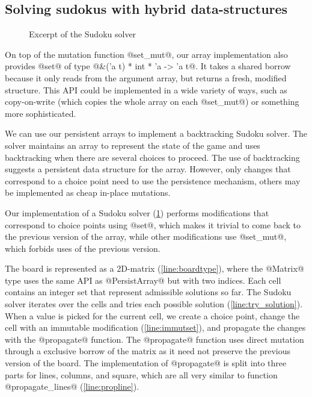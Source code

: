 \subsection{Solving sudokus with hybrid data-structures}

\begin{figure}[tp]
  
  \vspace{-15pt}
  \caption{Excerpt of the Sudoku solver}
  \label{ex:sudoku}
\end{figure}

On top of the mutation function @set_mut@, our array implementation
also provides @set@ of type @&('a t) * int * 'a -> 'a t@. It
takes a shared borrow because it only reads from the
argument array, but returns a fresh, modified structure.
%
This API could be implemented in a wide variety of ways, such as
copy-on-write (which copies the whole array on each @set_mut@)
or something more sophisticated\cite{DBLP:conf/ml/ConchonF07}.

We can use our persistent arrays
to implement a backtracking Sudoku solver.
The solver maintains an array to represent the state of
the game and uses backtracking when there are several choices to proceed.
The use of backtracking suggests a persistent data structure for the array.
However, only changes that correspond to a choice point need to use
the persistence mechanism, others may be implemented as
cheap in-place mutations.

Our implementation of a Sudoku solver (\cref{ex:sudoku}) performs
modifications that correspond to choice points using @set@,
which makes it trivial to come back to the previous version
of the array, while other modifications use @set_mut@, which
forbids uses of the previous version.

The board is represented as a 2D-matrix (\cref{line:boardtype}), where
the @Matrix@ type uses the same API as @PersistArray@
but with two indices.
Each cell contains an integer set that represent admissible solutions so far.
The Sudoku solver iterates over the cells and tries each possible solution (\cref{line:try_solution}).
When a value is picked for the current cell, we create a choice point,
change the cell with an immutable modification (\cref{line:immutset}), and propagate
the changes with the @propagate@ function.
The @propagate@ function uses direct mutation through a
exclusive borrow of the matrix as it need not preserve the previous
version of the board.
The implementation of @propagate@ is split into three parts
for lines, columns, and square, which are all very similar to function
@propagate_lines@ (\cref{line:propline}).

